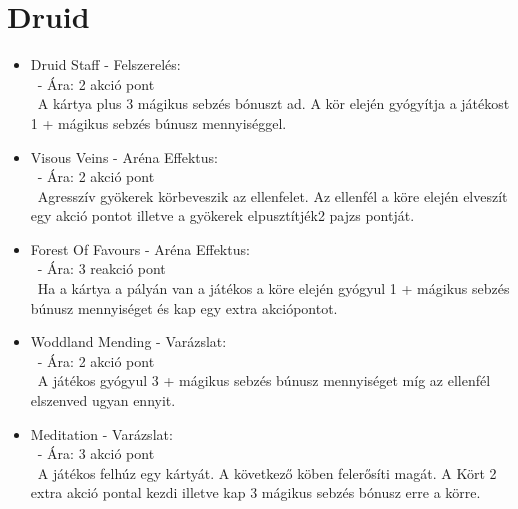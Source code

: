 \section{Druid}
\begin{itemize}
    \item Druid Staff - Felszerelés:\\\
    - Ára: 2 akció pont \\\
    A kártya plus 3 mágikus sebzés bónuszt ad. A kör elején gyógyítja a játékost 1 + mágikus sebzés búnusz mennyiséggel.
    \item Visous Veins - Aréna Effektus:\\\
    - Ára: 2 akció pont \\\
    Agresszív gyökerek körbeveszik az ellenfelet. Az ellenfél a köre elején elveszít egy akció pontot illetve a gyökerek elpusztítjék2 pajzs pontját.
    \item Forest Of Favours - Aréna Effektus:\\\
    - Ára: 3 reakció pont \\\
    Ha a kártya a pályán van a játékos a köre elején gyógyul 1 + mágikus sebzés búnusz mennyiséget és kap egy extra akciópontot.
    \item Woddland Mending - Varázslat:\\\
    - Ára: 2 akció pont \\\
    A játékos gyógyul 3 + mágikus sebzés búnusz mennyiséget míg az ellenfél elszenved ugyan ennyit.
    \item Meditation - Varázslat:\\\
    - Ára: 3 akció pont \\\
    A játékos felhúz egy kártyát. A következő köben felerősíti magát. A Kört 2 extra akció pontal kezdi illetve kap 3 mágikus sebzés bónusz erre a körre. 
\end{itemize}

